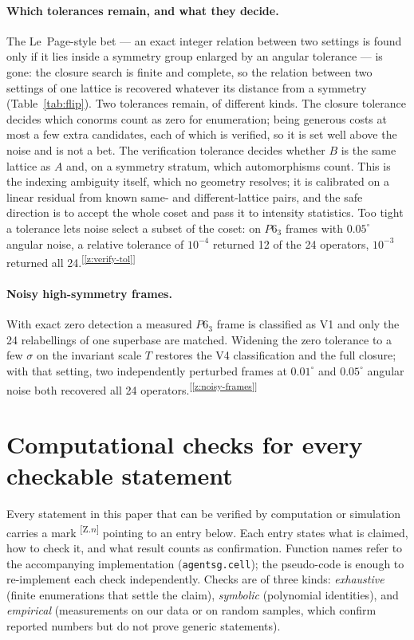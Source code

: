 \documentclass[11pt]{article}
\newcommand{\chk}[1]{\textsuperscript{[\ref{#1}]}}
\begin{document}
\paragraph{Which tolerances remain, and what they decide.}
The Le~Page-style bet --- an exact integer relation between two settings is found only if it lies inside a symmetry group enlarged by an angular tolerance --- is gone: the closure search is finite and complete, so the relation between two settings of one lattice is recovered whatever its distance from a symmetry (Table~\ref{tab:flip}). Two tolerances remain, of different kinds. The closure tolerance decides which conorms count as zero for enumeration; being generous costs at most a few extra candidates, each of which is verified, so it is set well above the noise and is not a bet. The verification tolerance decides whether $B$ is the same lattice as $A$ and, on a symmetry stratum, which automorphisms count. This is the indexing ambiguity itself, which no geometry resolves; it is calibrated on a linear residual from known same- and different-lattice pairs, and the safe direction is to accept the whole coset and pass it to intensity statistics. Too tight a tolerance lets noise select a subset of the coset: on $P6_3$ frames with $0.05^\circ$ angular noise, a relative tolerance of $10^{-4}$ returned 12 of the 24 operators, $10^{-3}$ returned all 24.\chk{z:verify-tol}

\paragraph{Noisy high-symmetry frames.}
With exact zero detection a measured $P6_3$ frame is classified as V1 and only the 24 relabellings of one superbase are matched. Widening the zero tolerance to a few $\sigma$ on the invariant scale $T$ restores the V4 classification and the full closure; with that setting, two independently perturbed frames at $0.01^\circ$ and $0.05^\circ$ angular noise both recovered all 24 operators.\chk{z:noisy-frames}


\section{Computational checks for every checkable statement}
\label{app:checks}

Every statement in this paper that can be verified by computation or simulation carries a mark \textsuperscript{[Z.$n$]} pointing to an entry below. Each entry states what is claimed, how to check it, and what result counts as confirmation. Function names refer to the accompanying implementation (\texttt{agentsg.cell}); the pseudo-code is enough to re-implement each check independently. Checks are of three kinds: \emph{exhaustive} (finite enumerations that settle the claim), \emph{symbolic} (polynomial identities), and \emph{empirical} (measurements on our data or on random samples, which confirm reported numbers but do not prove generic statements).
\end{document}
